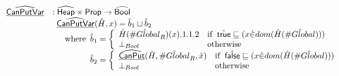 \documentclass{article}
\newcommand{\SF}[1]{\mbox{\textsf{#1}}}
\newcommand{\wherec}[1]{{\rm where}\begin{array}[t]{l}#1\end{array}}
\newcommand{\ifc}[1]{{\rm if}\begin{array}[t]{l}#1\end{array}}
\newcommand{\owc}{{\rm otherwise}}
\newcommand{\Prop}{\SF{Prop}}
\newcommand{\abs}[1]{\widehat{\SF{#1}}}
\newcommand{\aHeap}{\abs{Heap}}
\newcommand{\ahf}[1]{\widehat{\underline{\sf #1}}}
\newcommand{\avarloc}[1]{\hat{\##1}}
\newcommand{\atrue}{\hat{\SF{true}}}
\newcommand{\afalse}{\hat{\SF{false}}}
\begin{document}
\[\begin{array}{ll}
\ahf{CanPutVar} & : \aHeap \times \Prop \rightarrow \abs{Bool}\\
&
\begin{array}{ll}
\ahf{CanPutVar}(\hat{H},x)
  =  \hat{b}_1\sqcup\hat{b}_2\\
  \quad\wherec{
    \hat{b}_1 =
      \left\{
        \begin{array}{ll}
          \hat{H}(\avarloc{Global}_R)(x).1.1.2 & \ifc{\atrue\sqsubseteq(x \dot{\in} dom(\hat{H}(\avarloc{Global})))} \\
          \bot_{Bool} & \owc \\
        \end{array}
      \right.\\
    \hat{b}_2 = 
      \left\{
        \begin{array}{ll}
          \ahf{CanPut}(\hat{H},\avarloc{Global}_R,\hat{x}) & \ifc{\afalse\sqsubseteq(x \dot{\in} dom(\hat{H}(\avarloc{Global})))} \\
          \bot_{Bool} & \owc \\
        \end{array}
      \right.\\
  }
\end{array}\\
\\
\end{array}
\]
\end{document}
